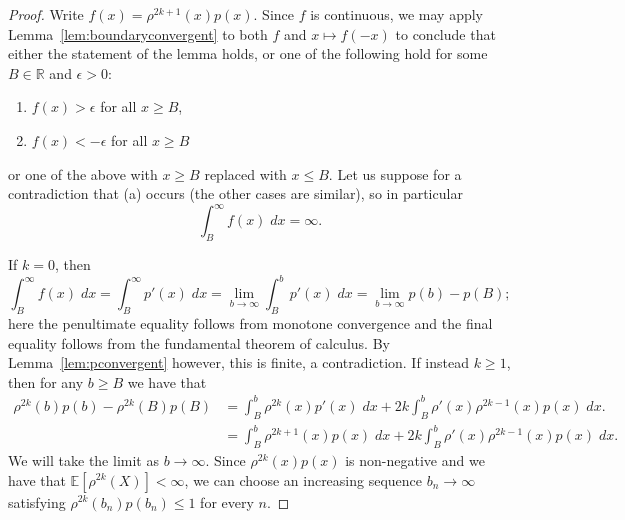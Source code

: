\documentclass[10pt,a4paper]{amsart}
\newcommand{\E}{\mathbb{E}}
\newcommand{\R}{\mathbb{R}}
\begin{document}
	\begin{proof}
		Write $f(x)=\rho^{2k+1}(x)p(x)$. Since $f$ is continuous, we may apply Lemma~\ref{lem:boundaryconvergent} to both $f$ and $x \mapsto f(-x)$ to conclude that either the statement of the lemma holds, or one of the following hold for some $B \in \R$ and $\epsilon > 0$:
		\begin{enumerate}[label=(\alph*)]
			\item $f(x) > \epsilon$ for all $x \geq B$,
			\item $f(x) < - \epsilon$ for all $x \geq B$
		\end{enumerate}
		or one of the above with $x \geq B$ replaced with $x \leq B$. Let us suppose for a contradiction that (a) occurs (the other cases are similar), so in particular
		\begin{equation}
			\int_{B}^\infty f(x)\; dx = \infty. \label{eqn:rho2k+1contradictioninfinite}
		\end{equation}
		
		
		If $k=0$, then \begin{equation*}
			\int_B^\infty f(x)\;dx = \int_B^\infty p'(x)\;dx = \lim_{b \to \infty} \int_B^b p'(x)\;dx = \lim_{b\to\infty} p(b) - p(B);
		\end{equation*}
		here the penultimate equality follows from monotone convergence and the final equality follows from the fundamental theorem of calculus.
		By Lemma~\ref{lem:pconvergent} however, this is finite, a contradiction. If instead $k\geq 1$, then for any $b\geq B$ we have that \begin{align}
			\rho^{2k}(b)p(b)-\rho^{2k}(B)p(B) &= \int_B^b \rho^{2k}(x)p'(x)\; dx + 2k\int_B^b \rho'(x)\rho^{2k-1}(x)p(x)\;dx.\nonumber\\
			&= \int_B^b \rho^{2k+1}(x)p(x)\; dx + 2k\int_B^b \rho'(x)\rho^{2k-1}(x)p(x)\;dx.\label{eqn:rho2k+1contradictionfinite}
		\end{align}
		We will take the limit as $b\to\infty$. Since $\rho^{2k}(x)p(x)$ is non-negative and we have that $\E[\rho^{2k}(X)]<\infty$, we can choose an increasing sequence $b_n\to\infty$ satisfying $\rho^{2k}(b_n)p(b_n) \leq 1$ for every $n$. 
		

\end{proof}
\end{document}
